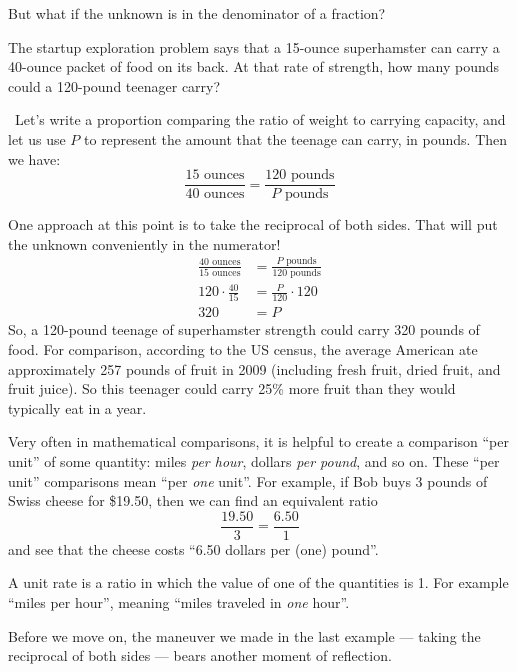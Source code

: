 But what if the unknown is in the denominator of a fraction?

\begin{boxedex}
The startup exploration problem says that a 15-ounce superhamster can carry a 40-ounce packet of food on its back. At that rate of strength, how many pounds could a 120-pound teenager carry?

\exsoln\ Let's write a proportion comparing the ratio of weight to carrying capacity, and let us use $P$ to represent the amount that the teenage can carry, in pounds. Then we have: \[\frac{15 \text{ ounces}}{40 \text{ ounces}} = \frac{120 \text{ pounds}}{P \text{ pounds}}\]

One approach at this point is to take the reciprocal of both sides. That will put the unknown conveniently in the numerator!
\[\begin{aligned}
\frac{40 \text{ ounces}}{15 \text{ ounces}} &= \frac{P \text{ pounds}}{120 \text{ pounds}}
\\[2ex]
120\cdot\frac{40}{15} &= \frac{P}{120}\cdot120
\\[2ex]
320 &= P
\end{aligned}\]
So, a 120-pound teenage of superhamster strength could carry 320 pounds of food. For comparison, according to the US census, the average American ate approximately 257 pounds of fruit in 2009 (including fresh fruit, dried fruit, and fruit juice). So this teenager could carry 25\% more fruit than they would typically eat in a year.
\end{boxedex}

Very often in mathematical comparisons, it is helpful to create a comparison ``per unit'' of some quantity: miles \textit{per hour}, dollars \textit{per pound}, and so on. These ``per unit'' comparisons mean ``per \textit{one} unit''. For example, if Bob buys 3 pounds of Swiss cheese for \$19.50, then we can find an equivalent ratio \[\frac{19.50}{3} = \frac{6.50}{1}\] and see that the cheese costs ``6.50 dollars per (one) pound''.

\begin{boxeddef}
A \gls{unit rate} is a ratio in which the value of one of the quantities is 1. For example ``miles per hour'', meaning ``miles traveled in \textit{one} hour''.
\end{boxeddef}

Before we move on, the maneuver we made in the last example --- taking the reciprocal of both sides --- bears another moment of reflection.

